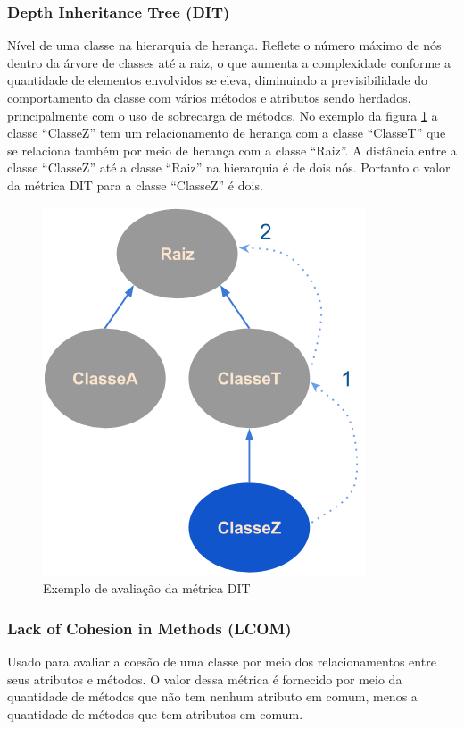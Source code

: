 \documentclass[conference]{IEEEtran}
\begin{document}
\subsubsection{\textbf{Depth Inheritance Tree (DIT)}}  Nível de uma classe na
hierarquia de herança. Reflete o número máximo de nós  dentro da árvore
de classes até a raiz, o que aumenta a complexidade conforme a quantidade de
elementos envolvidos se eleva, diminuindo a previsibilidade do comportamento da
classe com vários métodos e atributos sendo herdados, principalmente com o uso
de sobrecarga de métodos. No exemplo da figura \ref{fig:pic_dit} a classe
``ClasseZ'' tem um relacionamento de herança com a classe ``ClasseT'' que se
relaciona também por meio de herança com a classe ``Raiz''. A distância entre a
classe ``ClasseZ'' até a classe ``Raiz'' na hierarquia é de dois nós. Portanto o
valor da métrica DIT para a classe ``ClasseZ'' é dois.


\begin{figure}[htb]
	\begin{center}
		\includegraphics[scale=0.6]{img/pic_dit.png}
	\end{center}
	\caption{\label{fig:pic_dit}Exemplo de avaliação da métrica DIT}
	
\end{figure}


\subsubsection{\textbf{Lack of Cohesion in Methods (LCOM)}} Usado para avaliar a
coesão de uma classe por meio dos relacionamentos entre seus atributos e métodos.
O valor dessa métrica é fornecido por meio da quantidade de métodos que não tem
nenhum atributo em comum, menos a quantidade de métodos que tem atributos em
comum.
\end{document}

